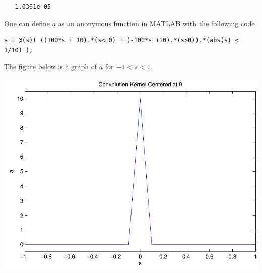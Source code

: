 \documentclass{homework}
\begin{document}
\begin{longproblem}
\begin{solution}
\begin{lstlisting}
   1.0361e-05
\end{lstlisting}
  \end{solution}


  \begin{solution}
  One can define $a$ as an anonymous function in MATLAB with the following code
  \begin{lstlisting}
a = @(s)( ((100*s + 10).*(s<=0) + (-100*s +10).*(s>0)).*(abs(s) < 1/10) );
  \end{lstlisting}
  The figure below is a graph of $a$ for $-1<s<1$.
  \begin{center}
  \includegraphics[width=.4\textwidth]{spike_kernel.pdf}
  \end{center}


\end{solution}
\end{longproblem}
\end{document}
